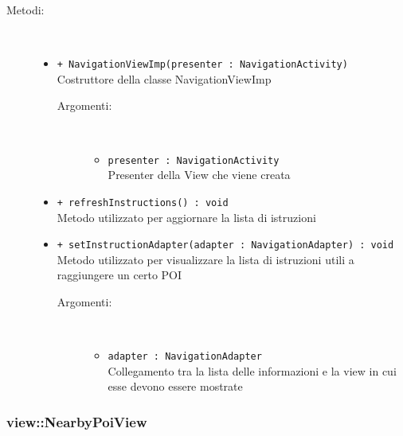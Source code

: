 \documentclass[../DefinizioneDiProdotto.tex]{subfiles}
\begin{document}
\begin{description}
\begin{itemize}
\end{itemize}
\item[Metodi:] \
\begin{itemize}
\item \texttt{+ NavigationViewImp(presenter : NavigationActivity)}\\
Costruttore della classe NavigationViewImp
 \begin{description}
\item[Argomenti:] \
\begin{itemize}
\item \texttt{presenter : NavigationActivity}\\
Presenter della View che viene creata\end{itemize}
\end{description}
\item \texttt{+ refreshInstructions() : void}\\
Metodo utilizzato per aggiornare la lista di istruzioni
 \item \texttt{+ setInstructionAdapter(adapter : NavigationAdapter) : void}\\
Metodo utilizzato per visualizzare la lista di istruzioni utili a raggiungere un certo POI
 \begin{description}
\item[Argomenti:] \
\begin{itemize}
\item \texttt{adapter : NavigationAdapter}\\
Collegamento tra la lista delle informazioni e la view in cui esse devono essere mostrate\end{itemize}
\end{description}
\end{itemize}
\end{description}

\subsubsection{view::NearbyPoiView}
\end{document}
